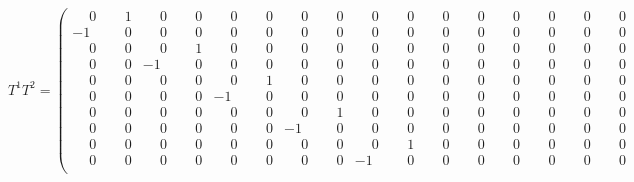 \documentclass[10pt]{article}
\begin{document}
\[
T^{1}T^{2} = \left(\begin{smallmatrix}
\phantom{-}0 & \phantom{-}1 & \phantom{-}0 & \phantom{-}0 & \phantom{-}0 & \phantom{-}0 & \phantom{-}0 & \phantom{-}0 & \phantom{-}0 & \phantom{-}0 & \phantom{-}0 & \phantom{-}0 & \phantom{-}0 & \phantom{-}0 & \phantom{-}0 & \phantom{-}0 \\
-1 & \phantom{-}0 & \phantom{-}0 & \phantom{-}0 & \phantom{-}0 & \phantom{-}0 & \phantom{-}0 & \phantom{-}0 & \phantom{-}0 & \phantom{-}0 & \phantom{-}0 & \phantom{-}0 & \phantom{-}0 & \phantom{-}0 & \phantom{-}0 & \phantom{-}0 \\
\phantom{-}0 & \phantom{-}0 & \phantom{-}0 & \phantom{-}1 & \phantom{-}0 & \phantom{-}0 & \phantom{-}0 & \phantom{-}0 & \phantom{-}0 & \phantom{-}0 & \phantom{-}0 & \phantom{-}0 & \phantom{-}0 & \phantom{-}0 & \phantom{-}0 & \phantom{-}0 \\
\phantom{-}0 & \phantom{-}0 & -1 & \phantom{-}0 & \phantom{-}0 & \phantom{-}0 & \phantom{-}0 & \phantom{-}0 & \phantom{-}0 & \phantom{-}0 & \phantom{-}0 & \phantom{-}0 & \phantom{-}0 & \phantom{-}0 & \phantom{-}0 & \phantom{-}0 \\
\phantom{-}0 & \phantom{-}0 & \phantom{-}0 & \phantom{-}0 & \phantom{-}0 & \phantom{-}1 & \phantom{-}0 & \phantom{-}0 & \phantom{-}0 & \phantom{-}0 & \phantom{-}0 & \phantom{-}0 & \phantom{-}0 & \phantom{-}0 & \phantom{-}0 & \phantom{-}0 \\
\phantom{-}0 & \phantom{-}0 & \phantom{-}0 & \phantom{-}0 & -1 & \phantom{-}0 & \phantom{-}0 & \phantom{-}0 & \phantom{-}0 & \phantom{-}0 & \phantom{-}0 & \phantom{-}0 & \phantom{-}0 & \phantom{-}0 & \phantom{-}0 & \phantom{-}0 \\
\phantom{-}0 & \phantom{-}0 & \phantom{-}0 & \phantom{-}0 & \phantom{-}0 & \phantom{-}0 & \phantom{-}0 & \phantom{-}1 & \phantom{-}0 & \phantom{-}0 & \phantom{-}0 & \phantom{-}0 & \phantom{-}0 & \phantom{-}0 & \phantom{-}0 & \phantom{-}0 \\
\phantom{-}0 & \phantom{-}0 & \phantom{-}0 & \phantom{-}0 & \phantom{-}0 & \phantom{-}0 & -1 & \phantom{-}0 & \phantom{-}0 & \phantom{-}0 & \phantom{-}0 & \phantom{-}0 & \phantom{-}0 & \phantom{-}0 & \phantom{-}0 & \phantom{-}0 \\
\phantom{-}0 & \phantom{-}0 & \phantom{-}0 & \phantom{-}0 & \phantom{-}0 & \phantom{-}0 & \phantom{-}0 & \phantom{-}0 & \phantom{-}0 & \phantom{-}1 & \phantom{-}0 & \phantom{-}0 & \phantom{-}0 & \phantom{-}0 & \phantom{-}0 & \phantom{-}0 \\
\phantom{-}0 & \phantom{-}0 & \phantom{-}0 & \phantom{-}0 & \phantom{-}0 & \phantom{-}0 & \phantom{-}0 & \phantom{-}0 & -1 & \phantom{-}0 & \phantom{-}0 & \phantom{-}0 & \phantom{-}0 & \phantom{-}0 & \phantom{-}0 & \phantom{-}0 \\

\end{smallmatrix}\]
\end{document}
